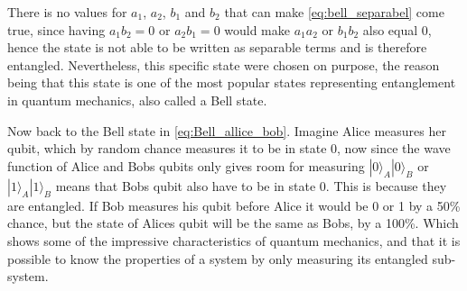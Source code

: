 \documentclass[../main.tex]{subfiles}
\begin{document}
There is no values for $a_1$, $a_2$, $b_1$ and $b_2$ that can make \autoref{eq:bell_separabel} come true, since having $a_1b_2=0$ or $a_2 b_1=0$ would make $a_1a_2$ or $b_1b_2$ also equal $0$, hence the state is not able to be written as separable terms and is therefore entangled. Nevertheless, this specific state were chosen on purpose, the reason being that this state is one of the most popular states representing entanglement in quantum mechanics, also called a Bell state.

Now back to the Bell state in \autoref{eq:Bell_allice_bob}. Imagine Alice measures her qubit, which by random chance measures it to be in state 0, now since the wave function of Alice and Bobs qubits only gives room for measuring $|0\rangle_{A}|0\rangle_{B}$ or $|1\rangle_{A}|1\rangle_{B}$ means that Bobs qubit also have to be in state 0. This is because they are entangled. If Bob measures his qubit before Alice it would be 0 or 1 by a 50\% chance, but the state of Alices qubit will be the same as Bobs, by a 100\%. Which shows some of the impressive characteristics of quantum mechanics, and that it is possible to know the properties of a system by only measuring its entangled sub-system.
\end{document}
